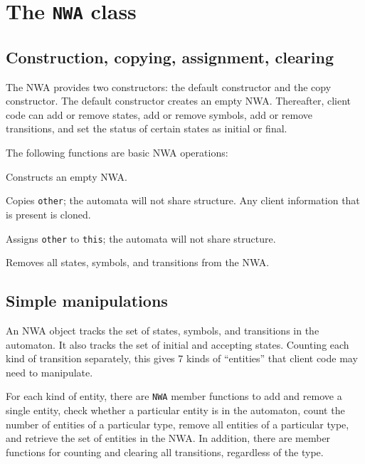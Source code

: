 \section{The \texttt{NWA} class}
\label{Se:NWA-class}

\subsection{Construction, copying, assignment, clearing}
\label{Se:Construction}

The NWA provides two constructors: the default constructor and the copy
constructor. The default constructor creates an empty NWA. Thereafter,
client code can add or remove states, add or remove symbols, add or remove
transitions, and set the status of certain states as initial or final.


The following functions are basic NWA operations:
\begin{functionlist}
    Constructs an empty NWA.

   Copies \texttt{other}; the
    automata will not share structure. Any client information that is present is cloned.

  \functionitem[\texttt{NWA::operator=(NWA const \& other)}] Assigns \texttt{other} to \texttt{this};
    the automata will not share structure.

   \nopagebreak
    Removes all states, symbols, and transitions from the NWA.

\end{functionlist}


\subsection{Simple manipulations}

An NWA object tracks the set of states, symbols, and transitions in the
automaton. It also tracks the set of initial and accepting states.
Counting each kind of transition separately, this gives 7 kinds of
``entities'' that client code may need to manipulate.

For each kind of entity, there are \texttt{NWA} member functions to add and
remove a single entity, check whether a particular entity is in the
automaton, count the number of entities of a particular type, remove all
entities of a particular type, and retrieve the set of entities in the
NWA. In addition, there are member functions for counting and clearing all
transitions, regardless of the type.

